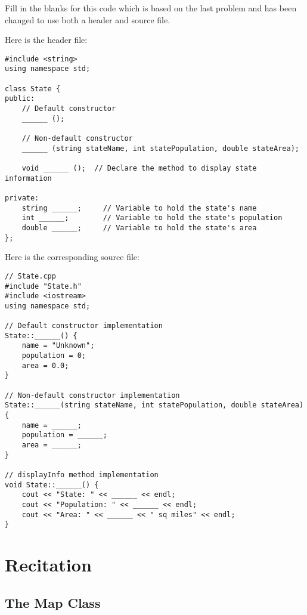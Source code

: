 \begin{problem}
    Fill in the blanks for this code which is based on the last problem and has been changed to use both a header and source file.

Here is the header file:
\begin{verbatim}
#include <string>
using namespace std;

class State {
public:
    // Default constructor
    ______ ();

    // Non-default constructor
    ______ (string stateName, int statePopulation, double stateArea);

    void ______ ();  // Declare the method to display state information

private:
    string ______;     // Variable to hold the state's name
    int ______;        // Variable to hold the state's population
    double ______;     // Variable to hold the state's area
};
\end{verbatim}

Here is the corresponding source file:
\begin{verbatim}
// State.cpp
#include "State.h"
#include <iostream>
using namespace std;

// Default constructor implementation
State::______() {
    name = "Unknown";
    population = 0;
    area = 0.0;
}

// Non-default constructor implementation
State::______(string stateName, int statePopulation, double stateArea) {
    name = ______;
    population = ______;
    area = ______;
}

// displayInfo method implementation
void State::______() {
    cout << "State: " << ______ << endl;
    cout << "Population: " << ______ << endl;
    cout << "Area: " << ______ << " sq miles" << endl;
}
\end{verbatim}
\end{problem}

\section{Recitation}

\subsection{The Map Class}

